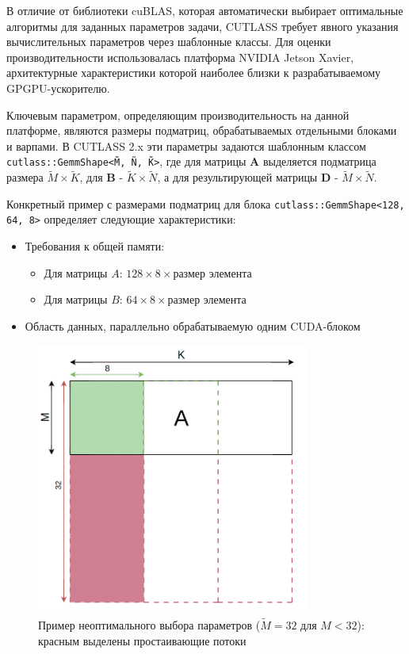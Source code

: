 В отличие от библиотеки cuBLAS, которая автоматически выбирает оптимальные алгоритмы для заданных параметров задачи,
CUTLASS требует явного указания вычислительных параметров через шаблонные классы.
Для оценки производительности использовалась платформа NVIDIA Jetson Xavier, архитектурные характеристики которой наиболее
близки к разрабатываемому GPGPU-ускорителю.

Ключевым параметром, определяющим производительность на данной платформе, являются размеры подматриц, обрабатываемых отдельными
блоками и варпами. В CUTLASS 2.x эти параметры задаются шаблонным классом \texttt{cutlass::GemmShape<\~{M}, \~{N}, \~{K}>}, где для матрицы
$\mathbf{A}$ выделяется подматрица размера $\tilde{M} \times \tilde{K}$, для $\mathbf{B}$ - $\tilde{K} \times \tilde{N}$, а для результирующей
матрицы $\mathbf{D}$ - $\tilde{M} \times \tilde{N}$.

Конкретный пример с размерами подматриц для блока \texttt{cutlass::GemmShape<128, 64, 8>} определяет следующие характеристики:
\begin{itemize}
    \item Требования к общей памяти:
    \begin{itemize}
        \item Для матрицы $A$: $128 \times 8 \times \text{размер элемента}$
        \item Для матрицы $B$: $64 \times 8 \times \text{размер элемента}$
    \end{itemize}
    \item Область данных, параллельно обрабатываемую одним CUDA-блоком
\end{itemize}

\begin{figure}[h]
    \centering
    \includegraphics[width=0.8\textwidth]{src/images/block_sizes_no_grid.png}
    \caption{Пример неоптимального выбора параметров ($\tilde{M}=32$ для $M<32$): красным выделены простаивающие потоки}
    \label{fig:block_sizes}
\end{figure}

